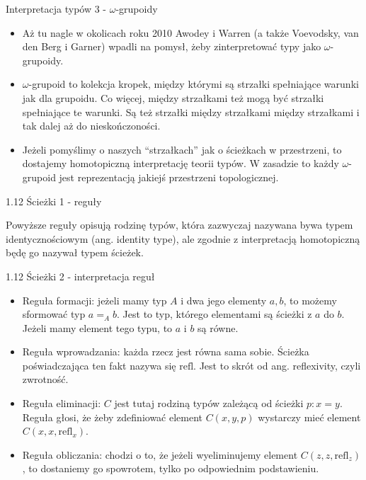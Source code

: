\documentclass{beamer}
\newcommand{\refl}[1]{\text{refl}_{#1}}
\begin{document}
\begin{frame}{Interpretacja typów 3 - $\omega$-grupoidy}
\begin{itemize}
	\item Aż tu nagle w okolicach roku 2010 Awodey i Warren (a także Voevodsky, van den Berg i Garner) wpadli na pomysł, żeby zinterpretować typy jako $\omega$-grupoidy.
	\item $\omega$-grupoid to kolekcja kropek, między którymi są strzałki spełniające warunki jak dla grupoidu. Co więcej, między strzałkami też mogą być strzałki spełniające te warunki. Są też strzałki między strzałkami między strzałkami i tak dalej aż do nieskończoności.
	\item Jeżeli pomyślimy o naszych ``strzałkach'' jak o ścieżkach w przestrzeni, to dostajemy homotopiczną interpretację teorii typów. W zasadzie to każdy $\omega$-grupoid jest reprezentacją jakiejś przestrzeni topologicznej.
\end{itemize}
\end{frame}

\begin{frame}{1.12 Ścieżki 1 - reguły}


Powyższe reguły opisują rodzinę typów, która zazwyczaj nazywana bywa typem identycznościowym (ang. identity type), ale zgodnie z interpretacją homotopiczną będę go nazywał typem ścieżek.

\end{frame}

\begin{frame}{1.12 Ścieżki 2 - interpretacja reguł}
\begin{itemize}
	\item Reguła formacji: jeżeli mamy typ $A$ i dwa jego elementy $a, b$, to możemy sformować typ $a =_A b$. Jest to typ, którego elementami są ścieżki z $a$ do $b$. Jeżeli mamy element tego typu, to $a$ i $b$ są równe.
	\item Reguła wprowadzania: każda rzecz jest równa sama sobie. Ścieżka poświadczająca ten fakt nazywa się $\text{refl}$. Jest to skrót od ang. reflexivity, czyli zwrotność.
	\item Reguła eliminacji: $C$ jest tutaj rodziną typów zależącą od ścieżki $p : x = y$. Reguła głosi, że żeby zdefiniować element $C(x, y, p)$ wystarczy mieć element $C(x, x, \refl{x})$.
	\item Reguła obliczania: chodzi o to, że jeżeli wyeliminujemy element $C(z, z, \refl{z})$, to dostaniemy go spowrotem, tylko po odpowiednim podstawieniu.
\end{itemize}
\end{frame}
\end{document}
